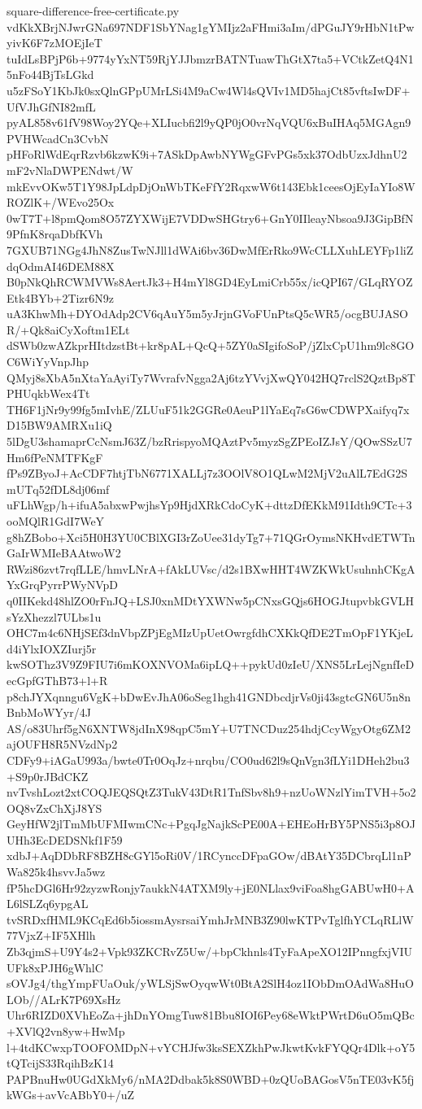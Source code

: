 \documentclass[11pt]{article}
\theoremstyle{definition}
\theoremstyle{remark}
\begin{document}
\begin{filecontents*}[overwrite]{square-difference-free-certificate.py}
vdKkXBrjNJwrGNa697NDF1SbYNag1gYMIjz2aFHmi3aIm/dPGuJY9rHbN1tPwyivK6F7zMOEjIeT
tuIdLsBPjP6b+9774yYxNT59RjYJJbmzrBATNTuawThGtX7ta5+VCtkZetQ4N15nFo44BjTsLGkd
u5zFSoY1KbJk0sxQlnGPpUMrLSi4M9aCw4Wl4sQVIv1MD5hajCt85vftsIwDF+UfVJhGfNI82mfL
pyAL858v61fV98Woy2YQe+XLIucbfi2l9yQP0jO0vrNqVQU6xBuIHAq5MGAgn9PVHWcadCn3CvbN
pHFoRlWdEqrRzvb6kzwK9i+7ASkDpAwbNYWgGFvPGs5xk37OdbUzxJdhnU2mF2vNlaDWPENdwt/W
mkEvvOKw5T1Y98JpLdpDjOnWbTKeFfY2RqxwW6t143Ebk1ceesOjEyIaYIo8WROZlK+/WEvo25Ox
0wT7T+l8pmQom8O57ZYXWijE7VDDwSHGtry6+GnY0IIleayNbsoa9J3GipBfN9PfnK8rqaDbfKVh
7GXUB71NGg4JhN8ZusTwNJll1dWAi6bv36DwMfErRko9WcCLLXuhLEYFp1liZdqOdmAI46DEM88X
B0pNkQhRCWMVWs8AertJk3+H4mYl8GD4EyLmiCrb55x/icQPI67/GLqRYOZEtk4BYb+2Tizr6N9z
uA3KhwMh+DYOdAdp2CV6qAuY5m5yJrjnGVoFUnPtsQ5cWR5/ocgBUJASOR/+Qk8aiCyXoftm1ELt
dSWb0zwAZkprHItdzstBt+kr8pAL+QcQ+5ZY0aSIgifoSoP/jZlxCpU1hm9lc8GOC6WiYyVnpJhp
QMyj8sXbA5nXtaYaAyiTy7WvrafvNgga2Aj6tzYVvjXwQY042HQ7rclS2QztBp8TPHUqkbWex4Tt
TH6F1jNr9y99fg5mIvhE/ZLUuF51k2GGRe0AeuP1lYaEq7sG6wCDWPXaifyq7xD15BW9AMRXu1iQ
5lDgU3shamaprCcNsmJ63Z/bzRrispyoMQAztPv5myzSgZPEoIZJsY/QOwSSzU7Hm6fPeNMTFKgF
fPs9ZByoJ+AcCDF7htjTbN6771XALLj7z3OOlV8O1QLwM2MjV2uAlL7EdG2SmUTq52fDL8dj06mf
uFLhWgp/h+ifuA5abxwPwjhsYp9HjdXRkCdoCyK+dttzDfEKkM91Idth9CTc+3ooMQlR1GdI7WeY
g8hZBobo+Xci5H0H3YU0CBlXGI3rZoUee31dyTg7+71QGrOymsNKHvdETWTnGaIrWMIeBAAtwoW2
RWzi86zvt7rqfLLE/hmvLNrA+fAkLUVsc/d2s1BXwHHT4WZKWkUsuhnhCKgAYxGrqPyrrPWyNVpD
q0IIKekd48hlZO0rFnJQ+LSJ0xnMDtYXWNw5pCNxsGQjs6HOGJtupvbkGVLHsYzXhezzl7ULbs1u
OHC7m4c6NHjSEf3dnVbpZPjEgMIzUpUetOwrgfdhCXKkQfDE2TmOpF1YKjeLd4iYlxIOXZIurj5r
kwSOThz3V9Z9FIU7i6mKOXNVOMa6ipLQ++pykUd0zIeU/XNS5LrLejNgnfIeDecGpfGThB73+l+R
p8chJYXqnngu6VgK+bDwEvJhA06oSeg1hgh41GNDbcdjrVs0ji43sgtcGN6U5n8nBnbMoWYyr/4J
AS/o83Uhrf5gN6XNTW8jdInX98qpC5mY+U7TNCDuz254hdjCcyWgyOtg6ZM2ajOUFH8R5NVzdNp2
CDFy9+iAGaU993a/bwte0Tr0OqJz+nrqbu/CO0ud62l9sQnVgn3fLYi1DHeh2bu3+S9p0rJBdCKZ
nvTvshLozt2xtCOQJEQSQtZ3TukV43DtR1TnfSbv8h9+nzUoWNzlYimTVH+5o2OQ8vZxChXjJ8YS
GeyHfW2jlTmMbUFMIwmCNc+PgqJgNajkScPE00A+EHEoHrBY5PNS5i3p8OJUHh3EcDEDSNkf1F59
xdbJ+AqDDbRF8BZH8cGYl5oRi0V/1RCynccDFpaGOw/dBAtY35DCbrqLl1nPWa825k4hsvvJa5wz
fP5hcDGl6Hr92zyzwRonjy7aukkN4ATXM9ly+jE0NLlax9viFoa8hgGABUwH0+AL6lSLZq6ypgAL
tvSRDxfHML9KCqEd6b5iossmAysrsaiYmhJrMNB3Z90lwKTPvTglfhYCLqRLlW77VjxZ+IF5XHlh
Zb3qjmS+U9Y4s2+Vpk93ZKCRvZ5Uw/+bpCkhnls4TyFaApeXO12IPnngfxjVIUUFk8xPJH6gWhlC
sOVJg4/thgYmpFUaOuk/yWLSjSwOyqwWt0BtA2SlH4oz1IObDmOAdWa8HuOLOb//ALrK7P69XsHz
Uhr6RIZD0XVhEoZa+jhDnYOmgTuw81Bbu8IOI6Pey68eWktPWrtD6uO5mQBc+XVlQ2vn8yw+HwMp
l+4tdKCwxpTOOFOMDpN+vYCHJfw3ksSEXZkhPwJkwtKvkFYQQr4Dlk+oY5tQTcijS33RqihBzK14
PAPBnuHw0UGdXkMy6/nMA2Ddbak5k8S0WBD+0zQUoBAGosV5nTE03vK5fjkWGs+avVcABbY0+/uZ

\end{filecontents*}
\end{document}
